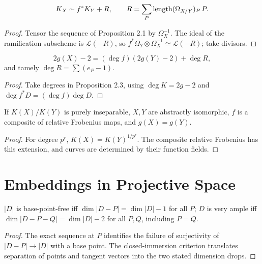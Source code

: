 \begin{proposition}\label{ha-ch4-p23}
\[
K_X\sim f^*K_Y+R,\qquad
R=\sum_P\operatorname{length}(\Omega_{X/Y})_P\,P.
\]
\end{proposition}
\begin{proof}
Tensor the sequence of Proposition 2.1 by \(\Omega_X^{-1}\).  The ideal of
the ramification subscheme is \(\mathcal L(-R)\), so
\(f^*\Omega_Y\otimes\Omega_X^{-1}\simeq\mathcal L(-R)\); take divisors.
\end{proof}

\begin{corollary}[Hurwitz]\label{ha-ch4-c24}
\[
2g(X)-2=(\deg f)(2g(Y)-2)+\deg R,
\]
and tamely \(\deg R=\sum(e_P-1)\).
\end{corollary}
\begin{proof}
Take degrees in Proposition 2.3, using \(\deg K=2g-2\) and
\(\deg f^*D=(\deg f)\deg D\).
\end{proof}

\begin{proposition}\label{ha-ch4-p25}
If \(K(X)/K(Y)\) is purely inseparable, \(X,Y\) are abstractly isomorphic,
\(f\) is a composite of relative Frobenius maps, and \(g(X)=g(Y)\).
\end{proposition}
\begin{proof}
For degree \(p^r\), \(K(X)=K(Y)^{1/p^r}\).  The composite relative Frobenius
has this extension, and curves are determined by their function fields.
\end{proof}

\section{Embeddings in Projective Space}
\label{ha-ch4-s3}
\begin{proposition}\label{ha-ch4-p31}
\(|D|\) is base-point-free iff \(\dim|D-P|=\dim|D|-1\) for all \(P\); \(D\)
is very ample iff \(\dim|D-P-Q|=\dim|D|-2\) for all \(P,Q\), including
\(P=Q\).
\end{proposition}
\begin{proof}
The exact sequence at \(P\) identifies the failure of surjectivity of
\(|D-P|\to|D|\) with a base point.  The closed-immersion criterion translates
separation of points and tangent vectors into the two stated dimension drops.
\end{proof}

